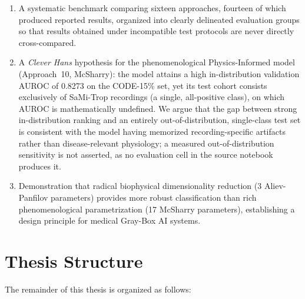 \begin{enumerate}
    \item A systematic benchmark comparing sixteen approaches, fourteen of which produced reported results, organized into clearly delineated evaluation groups so that results obtained under incompatible test protocols are never directly cross-compared.
    \item A \textit{Clever Hans} hypothesis for the phenomenological Physics-Informed model (Approach~10, McSharry): the model attains a high in-distribution validation AUROC of 0.8273 on the CODE-15\% set, yet its test cohort consists exclusively of SaMi-Trop recordings (a single, all-positive class), on which AUROC is mathematically undefined. We argue that the gap between strong in-distribution ranking and an entirely out-of-distribution, single-class test set is consistent with the model having memorized recording-specific artifacts rather than disease-relevant physiology; a measured out-of-distribution sensitivity is not asserted, as no evaluation cell in the source notebook produces it.
    \item Demonstration that radical biophysical dimensionality reduction (3 Aliev-Panfilov parameters) provides more robust classification than rich phenomenological parametrization (17 McSharry parameters), establishing a design principle for medical Gray-Box AI systems.
\end{enumerate}

\section{Thesis Structure}

The remainder of this thesis is organized as follows:

